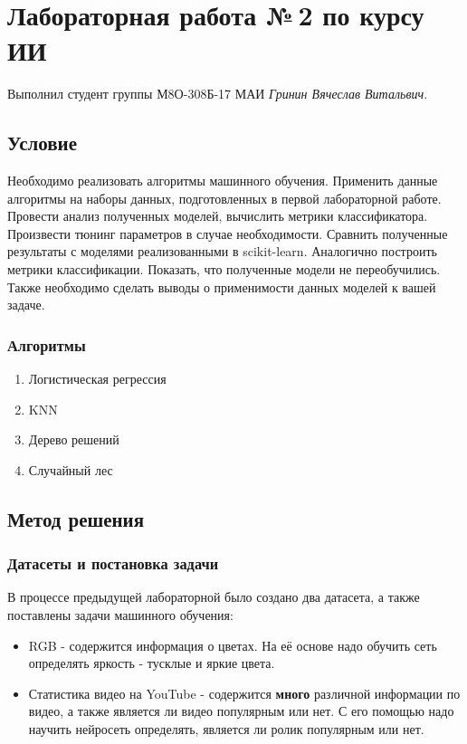 \documentclass[12pt]{article}
\begin{document}
	\section*{Лабораторная работа №\,2 по курсу ИИ}
	Выполнил студент группы М8О-308Б-17 МАИ \textit{Гринин Вячеслав Витальвич}.
	
	\subsection*{Условие}
	
	Необходимо реализовать алгоритмы машинного обучения. Применить данные алгоритмы на наборы данных, подготовленных в первой лабораторной работе. Провести анализ полученных моделей, вычислить метрики классификатора. Произвести тюнинг параметров в случае необходимости. Сравнить полученные результаты с моделями реализованными в scikit-learn. Аналогично построить метрики классификации. Показать, что полученные модели не переобучились. Также необходимо сделать выводы о применимости данных моделей к вашей задаче.
	
	\subsubsection*{Алгоритмы}
	\begin{enumerate}
	    \item Логистическая регрессия
	    \item KNN
	    \item Дерево решений
	    \item Случайный лес
	\end{enumerate}
	
	\subsection*{Метод решения}
	
	\subsubsection*{Датасеты и постановка задачи}
    
    В процессе предыдущей лабораторной было создано два датасета, а также поставлены задачи машинного обучения:
    \begin{itemize}
        \item RGB - содержится информация о цветах. На её основе надо обучить сеть определять яркость - тусклые и яркие цвета.
        \item Статистика видео на YouTube - содержится {\bf много} различной информации по видео, а также является ли видео популярным или нет. С его помощью надо научить нейросеть определять, является ли ролик популярным или нет.
    \end{itemize}
    
\end{document}
